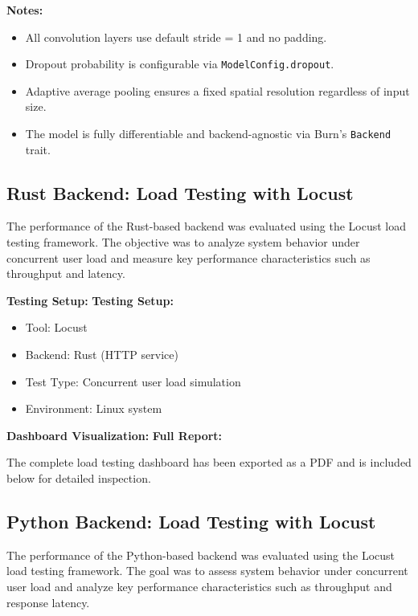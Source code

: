 \documentclass{ieeeaccess}
\begin{document}
\noindent\textbf{Notes:}
\begin{itemize}
  \item All convolution layers use default stride = 1 and no padding.
  \item Dropout probability is configurable via \texttt{ModelConfig.dropout}.
  \item Adaptive average pooling ensures a fixed spatial resolution regardless of input size.
  \item The model is fully differentiable and backend-agnostic via Burn's \texttt{Backend} trait.
\end{itemize}


\subsection{Rust Backend: Load Testing with Locust}

The performance of the Rust-based backend was evaluated using the Locust load testing framework. The objective was to analyze system behavior under concurrent user load and measure key performance characteristics such as throughput and latency.

\textbf{Testing Setup:}
\textbf{Testing Setup:}
\begin{itemize}
    \item Tool: Locust
    \item Backend: Rust (HTTP service)
    \item Test Type: Concurrent user load simulation
    \item Environment: Linux system
\end{itemize}

\textbf{Dashboard Visualization:}
\textbf{Full Report:}

The complete load testing dashboard has been exported as a PDF and is included below for detailed inspection.




\subsection{Python Backend: Load Testing with Locust}

The performance of the Python-based backend was evaluated using the Locust load testing framework. The goal was to assess system behavior under concurrent user load and analyze key performance characteristics such as throughput and response latency.
\end{document}
